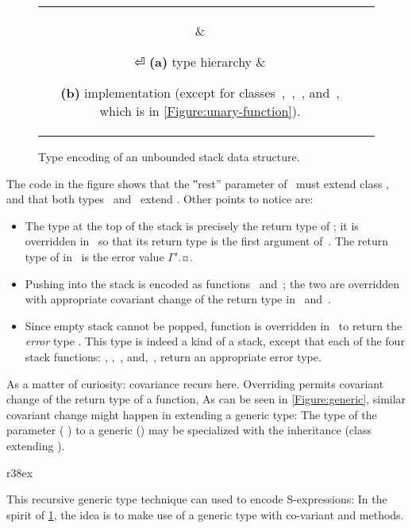 \begin{figure}[htb]
  \caption{Type encoding of an unbounded stack data structure.}
  \label{Figure:stack-encoding} 
  \begin{tabular}{cc}
    \parbox[c]{0.3\linewidth}{} &
    \hspace{-3ex} \parbox[c]{63ex}{}⏎
    \textbf{(a)} type hierarchy                                            &
    \hspace{-3ex} \parbox[t]{63ex}{%
    \textbf{(b)} implementation (except
    for classes~,~,~, and~, which is in \cref{Figure:unary-function}).}
  \end{tabular}
\end{figure}

The code in the figure shows that the ‟rest” parameter of~ must extend class ,
  and that both types~ and~ extend .
Other points to notice are:
\begin{itemize}
  \item The type at the top of the stack is precisely the return type of ;
        it is overridden in~ so that its return type is the first argument of~.
        The return type of  in~ is the error value {$Γ'$.¤}.
  \item Pushing into the stack is encoded as functions~ and~;
        the two are overridden with appropriate covariant change of the return type in~ and~.

  \item Since empty stack cannot be popped, function  is overridden in~ to return
    the \emph{error} type . This type is indeed a kind of a stack, except that each of the four stack
        functions: , ,~, and,~, return an appropriate error type.
\end{itemize}

As a matter of curiosity: covariance recurs here.
Overriding permits covariant change of the return type of a function,
As can be seen in \cref{Figure:generic}, similar covariant change might happen in extending a generic type: 
The type of the parameter ( ) to a generic () may 
be specialized with the inheritance (class  extending ). 
\begin{wrapfigure}[7]{r}{38ex}
  \caption{\label{Figure:generic} Covariance with generics}
\end{wrapfigure}

This recursive generic type technique can used to encode S-expressions: In the spirit of 
  \cref{Figure:stack-encoding}, the idea is to make use of a  generic type
  with co-variant  and  methods. 

